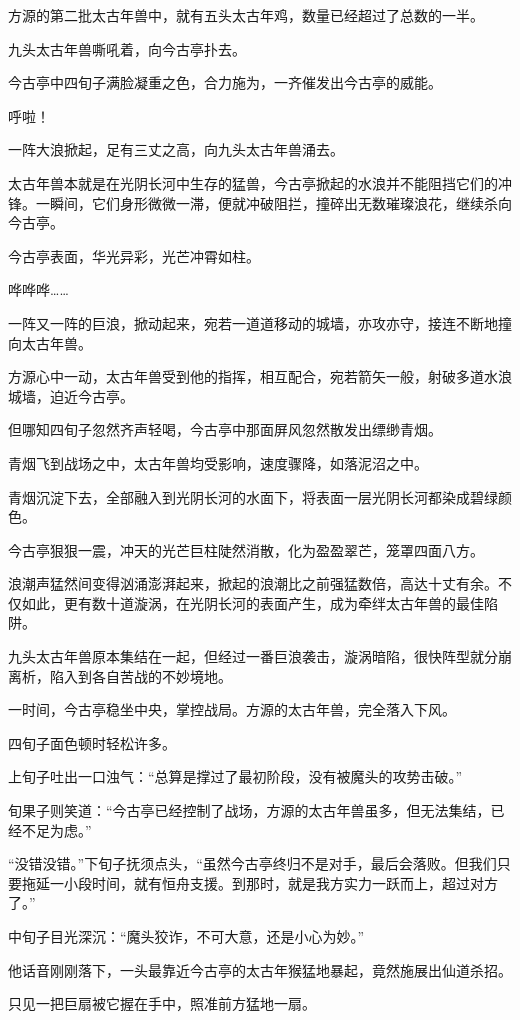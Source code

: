 \begin{this_body}
方源的第二批太古年兽中，就有五头太古年鸡，数量已经超过了总数的一半。

九头太古年兽嘶吼着，向今古亭扑去。

今古亭中四旬子满脸凝重之色，合力施为，一齐催发出今古亭的威能。

呼啦！

一阵大浪掀起，足有三丈之高，向九头太古年兽涌去。

太古年兽本就是在光阴长河中生存的猛兽，今古亭掀起的水浪并不能阻挡它们的冲锋。一瞬间，它们身形微微一滞，便就冲破阻拦，撞碎出无数璀璨浪花，继续杀向今古亭。

今古亭表面，华光异彩，光芒冲霄如柱。

哗哗哗……

一阵又一阵的巨浪，掀动起来，宛若一道道移动的城墙，亦攻亦守，接连不断地撞向太古年兽。

方源心中一动，太古年兽受到他的指挥，相互配合，宛若箭矢一般，射破多道水浪城墙，迫近今古亭。

但哪知四旬子忽然齐声轻喝，今古亭中那面屏风忽然散发出缥缈青烟。

青烟飞到战场之中，太古年兽均受影响，速度骤降，如落泥沼之中。

青烟沉淀下去，全部融入到光阴长河的水面下，将表面一层光阴长河都染成碧绿颜色。

今古亭狠狠一震，冲天的光芒巨柱陡然消散，化为盈盈翠芒，笼罩四面八方。

浪潮声猛然间变得汹涌澎湃起来，掀起的浪潮比之前强猛数倍，高达十丈有余。不仅如此，更有数十道漩涡，在光阴长河的表面产生，成为牵绊太古年兽的最佳陷阱。

九头太古年兽原本集结在一起，但经过一番巨浪袭击，漩涡暗陷，很快阵型就分崩离析，陷入到各自苦战的不妙境地。

一时间，今古亭稳坐中央，掌控战局。方源的太古年兽，完全落入下风。

四旬子面色顿时轻松许多。

上旬子吐出一口浊气：“总算是撑过了最初阶段，没有被魔头的攻势击破。”

旬果子则笑道：“今古亭已经控制了战场，方源的太古年兽虽多，但无法集结，已经不足为虑。”

“没错没错。”下旬子抚须点头，“虽然今古亭终归不是对手，最后会落败。但我们只要拖延一小段时间，就有恒舟支援。到那时，就是我方实力一跃而上，超过对方了。”

中旬子目光深沉：“魔头狡诈，不可大意，还是小心为妙。”

他话音刚刚落下，一头最靠近今古亭的太古年猴猛地暴起，竟然施展出仙道杀招。

只见一把巨扇被它握在手中，照准前方猛地一扇。


\end{this_body}
